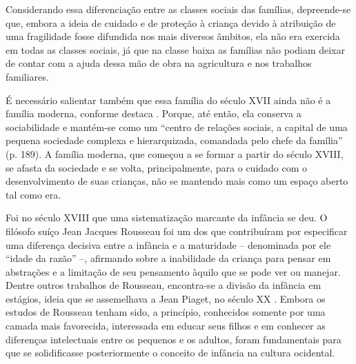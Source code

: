 Considerando essa diferenciação entre as classes sociais das famílias, depreende-se que, embora a ideia de cuidado e de proteção à criança devido à atribuição de uma fragilidade fosse difundida nos mais diversos âmbitos, ela não era exercida em todas as classes sociais, já que na classe baixa as famílias não podiam deixar de contar com a ajuda dessa mão de obra na agricultura e nos trabalhos familiares\footnotemark.


É necessário salientar também que essa família do século XVII ainda não é a família moderna, conforme destaca . Porque, até então, ela conserva a sociabilidade e mantém-se como um ``centro de relações sociais, a capital de uma pequena sociedade complexa e hierarquizada, comandada pelo chefe da família'' (p. 189). A família moderna, que começou a se formar a partir do século XVIII, se afasta da sociedade e se volta, principalmente, para o cuidado com o desenvolvimento de suas crianças, não se mantendo mais como um espaço aberto tal como era.

Foi no século XVIII que uma sistematização marcante da infância se deu. O filósofo suíço Jean Jacques Rousseau foi um dos que contribuíram por especificar uma diferença decisiva entre a infância e a maturidade -- denominada por ele ``idade da razão'' --, afirmando sobre a inabilidade da criança para pensar em abstrações e a limitação de seu pensamento àquilo que se pode ver ou manejar. Dentre outros trabalhos de Rousseau, encontra-se a divisão da infância em estágios, ideia que se assemelhava a Jean Piaget\footnotemark, no século XX \cite[p. 9]{GALLATIN1978}. Embora os estudos de Rousseau tenham sido, a princípio, conhecidos somente por uma camada mais favorecida, interessada em educar seus filhos e em conhecer as diferenças intelectuais entre os pequenos e os adultos, foram fundamentais para que se solidificasse posteriormente o conceito de infância na cultura ocidental.  


